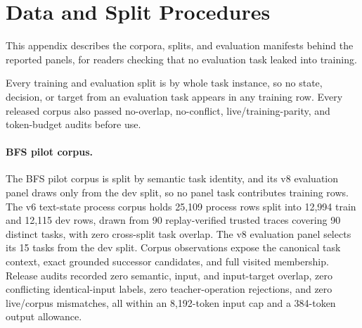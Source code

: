 \section{Data and Split Procedures}
\label{app:data-splits}

This appendix describes the corpora, splits, and evaluation manifests behind the reported panels, for readers checking that no evaluation task leaked into training.

Every training and evaluation split is by whole task instance, so no state, decision, or target from an evaluation task appears in any training row. Every released corpus also passed no-overlap, no-conflict, live/training-parity, and token-budget audits before use.

\paragraph{BFS pilot corpus.}
The BFS pilot corpus is split by semantic task identity, and its v8 evaluation panel draws only from the dev split, so no panel task contributes training rows. The v6 text-state process corpus holds 25,109 process rows split into 12,994 train and 12,115 dev rows, drawn from 90 replay-verified trusted traces covering 90 distinct tasks, with zero cross-split task overlap. The v8 evaluation panel selects its 15 tasks from the dev split. Corpus observations expose the canonical task context, exact grounded successor candidates, and full visited membership. Release audits recorded zero semantic, input, and input-target overlap, zero conflicting identical-input labels, zero teacher-operation rejections, and zero live/corpus mismatches, all within an 8,192-token input cap and a 384-token output allowance.

